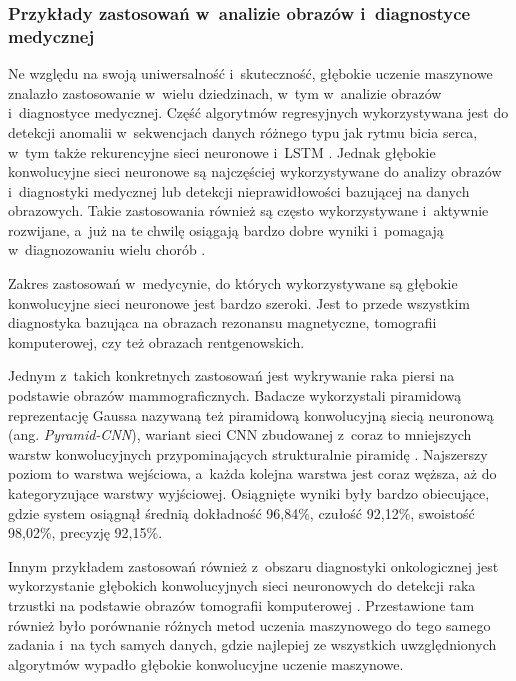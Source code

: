 \subsubsection{Przykłady zastosowań w~analizie obrazów i~diagnostyce medycznej}

Ne względu na swoją uniwersalność i~skuteczność, głębokie uczenie maszynowe znalazło zastosowanie w~wielu dziedzinach, w~tym w~analizie obrazów i~diagnostyce medycznej.
Część algorytmów regresyjnych wykorzystywana jest do detekcji anomalii w~sekwencjach danych różnego typu jak rytmu bicia serca, w~tym także rekurencyjne sieci neuronowe i~LSTM \cite{fernando2021deep}.
Jednak głębokie konwolucyjne sieci neuronowe są najczęściej wykorzystywane do analizy obrazów i~diagnostyki medycznej lub detekcji nieprawidłowości bazującej na danych obrazowych.
Takie zastosowania również są często wykorzystywane i~aktywnie rozwijane, a~już na te chwilę osiągają bardzo dobre wyniki i~pomagają w~diagnozowaniu wielu chorób \cite{liu2017survey}.

Zakres zastosowań w~medycynie, do których wykorzystywane są głębokie konwolucyjne sieci neuronowe jest bardzo szeroki.
Jest to przede wszystkim diagnostyka bazująca na obrazach rezonansu magnetyczne, tomografii komputerowej, czy też obrazach rentgenowskich.

Jednym z~takich konkretnych zastosowań jest wykrywanie raka piersi na podstawie obrazów mammograficznych.
Badacze wykorzystali piramidową reprezentację Gaussa nazywaną też piramidową konwolucyjną siecią neuronową (ang. \emph{Pyramid-CNN}), wariant sieci CNN zbudowanej z~coraz to mniejszych warstw konwolucyjnych przypominających strukturalnie piramidę \cite{bakkouri2019multi}.
Najszerszy poziom to warstwa wejściowa, a~każda kolejna warstwa jest coraz węższa, aż do kategoryzujące warstwy wyjściowej.
Osiągnięte wyniki były bardzo obiecujące, gdzie system osiągnął średnią dokładność 96,84\%, czułość 92,12\%, swoistość 98,02\%, precyzję 92,15\%.

Innym przykładem zastosowań również z~obszaru diagnostyki onkologicznej jest wykorzystanie głębokich konwolucyjnych sieci neuronowych do detekcji raka trzustki na podstawie obrazów tomografii komputerowej \cite{sekaran2020deep}.
Przestawione tam również było porównanie różnych metod uczenia maszynowego do tego samego zadania i~na tych samych danych, gdzie najlepiej ze wszystkich uwzględnionych algorytmów wypadło głębokie konwolucyjne uczenie maszynowe.


